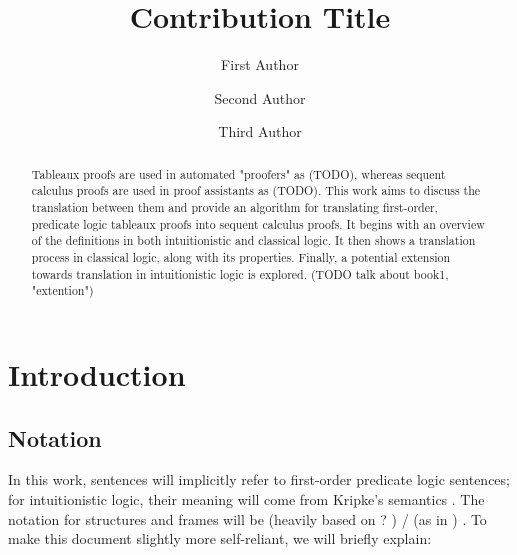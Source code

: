 \documentclass[runningheads]{llncs}
\begin{document}
%
\title{Contribution Title}
%
%
\author{First Author \and
Second Author \and
Third Author}
%
%
%
\maketitle              %
%
\begin{abstract}
Tableaux proofs are used in automated  "proofers" as (TODO), whereas sequent calculus 
proofs are used in proof assistants as (TODO). This work aims to discuss the translation between them and provide an 
algorithm for translating first-order, predicate logic tableaux proofs into sequent calculus proofs.
It begins with an overview of the definitions 
in both intuitionistic and classical logic.
 It then shows a translation process in classical logic, along with its properties. 
 Finally, a potential extension towards translation in intuitionistic logic is explored.
 (TODO talk about book1, "extention")
\end{abstract}
%
%
%
\section{Introduction}
\subsection{Notation}
In this work, sentences will implicitly refer to first-order predicate logic sentences; for intuitionistic logic, their meaning will come from Kripke's semantics \cite{kripke1965} . The notation for structures and frames will be (heavily based on ? ) / (as in ) \cite{book1}. 
To make this document slightly more self-reliant, we will briefly explain:  
\end{document}
